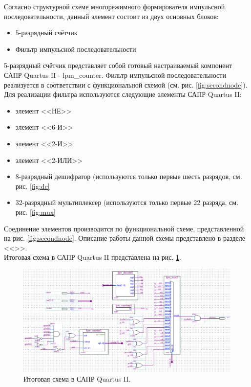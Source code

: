 Согласно структурной схеме многорежимного формирователя импульсной последовательности, данный элемент состоит из двух основных блоков:
\begin{itemize}
\item 5-разрядный счётчик
\item Фильтр импульсной последовательности
\end{itemize}

5-разрядный счётчик представляет собой готовый настраиваемый компонент САПР Quartus II - lpm\_counter. Фильтр импульсной последовательности реализуется в соответствии с функциональной схемой (см. рис. \ref{fig:secondnode}). Для реализации фильтра используются следующие элементы САПР Quartus II:
\begin{itemize}
\item элемент <<НЕ>>
\item элемент <<6-И>>
\item элемент <<2-И>>
\item элемент <<2-ИЛИ>>
\item 8-разрядный дешифратор (используются только первые шесть разрядов, см. рис. \ref{fig:dc}
\item 32-разрядный мультиплексер (используются только первые 22 разряда, см. рис. \ref{fig:mux}
\end{itemize}

\noindent Соединение элементов производится по функциональной схеме, представленной на рис. \ref{fig:secondnode}. Описание работы данной схемы представлено в разделе <<>>.\\
Итоговая схема в САПР Quartus II представлена на рис. \ref{fig:finalscheme}.

\begin{figure}
  \begin{center}
    \includegraphics[scale=0.65]{./final-scheme.png}
    \caption{Итоговая схема в САПР Quartus II.}
    \label{fig:finalscheme}
  \end{center}
\end{figure}